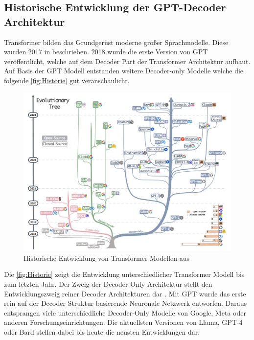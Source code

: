 \documentclass[conference]{IEEEtran}
\begin{document}
\subsection{Historische Entwicklung der GPT-Decoder Architektur}
Transformer bilden das Grundgerüst moderne großer Sprachmodelle. Diese wurden 2017 in \cite{vaswaniAttentionAllYou2023}  beschrieben. 2018 wurde die erste Version von GPT veröffentlicht, welche auf dem Decoder Part der Transformer Architektur aufbaut. Auf Basis der GPT Modell entstanden weitere Decoder-only Modelle welche die folgende \autoref{fig:Historie} gut veranschaulicht.
\begin{figure}[htbp]
    \centerline{\includegraphics[width=\linewidth]{Bilder/EntwicklungLLM.png}}
    \caption{Historische Entwicklung von Transformer Modellen aus \cite{yangHarnessingPowerLLMs}}
    \label{fig:Historie}
\end{figure}
Die \autoref{fig:Historie} zeigt die Entwicklung unterschiedlicher Transformer Modell bis zum letzten Jahr. Der Zweig der Decoder Only Architektur stellt den Entwicklungszweig reiner Decoder Architekturen dar . Mit GPT wurde das erste rein auf der Decoder Struktur basierende Neuronale Netzwerk entworfen. Daraus entsprangen viele unterschiedliche Decoder-Only Modelle von Google, Meta oder anderen Forschungseinrichtungen. Die aktuellsten Versionen von Llama, GPT-4 oder Bard stellen dabei bis heute die neusten Entwicklungen dar.
\end{document}
